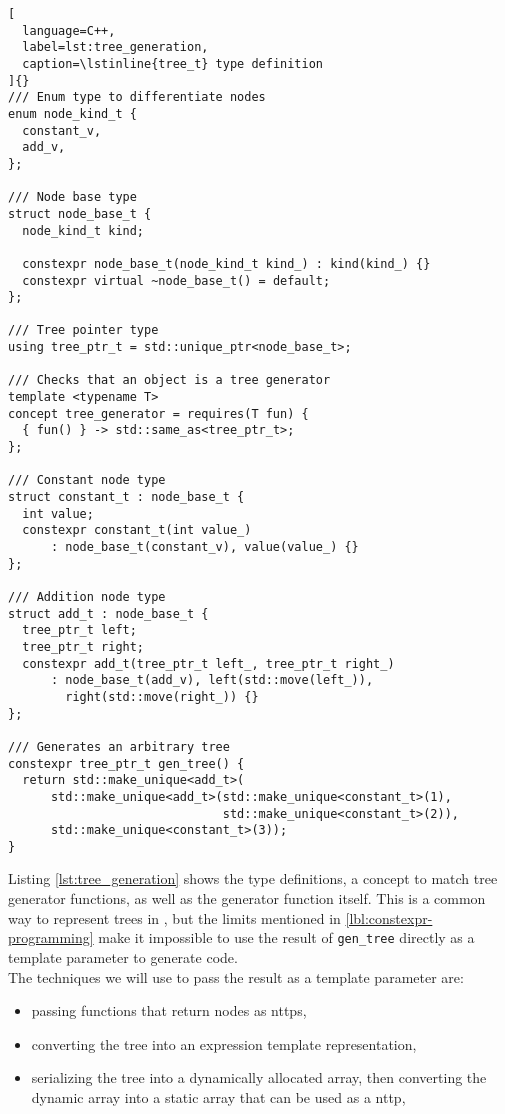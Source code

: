 \documentclass[../main]{subfiles}
\begin{document}
\begin{lstlisting}[
  language=C++,
  label=lst:tree_generation,
  caption=\lstinline{tree_t} type definition
]{}
/// Enum type to differentiate nodes
enum node_kind_t {
  constant_v,
  add_v,
};

/// Node base type
struct node_base_t {
  node_kind_t kind;

  constexpr node_base_t(node_kind_t kind_) : kind(kind_) {}
  constexpr virtual ~node_base_t() = default;
};

/// Tree pointer type
using tree_ptr_t = std::unique_ptr<node_base_t>;

/// Checks that an object is a tree generator
template <typename T>
concept tree_generator = requires(T fun) {
  { fun() } -> std::same_as<tree_ptr_t>;
};

/// Constant node type
struct constant_t : node_base_t {
  int value;
  constexpr constant_t(int value_)
      : node_base_t(constant_v), value(value_) {}
};

/// Addition node type
struct add_t : node_base_t {
  tree_ptr_t left;
  tree_ptr_t right;
  constexpr add_t(tree_ptr_t left_, tree_ptr_t right_)
      : node_base_t(add_v), left(std::move(left_)),
        right(std::move(right_)) {}
};

/// Generates an arbitrary tree
constexpr tree_ptr_t gen_tree() {
  return std::make_unique<add_t>(
      std::make_unique<add_t>(std::make_unique<constant_t>(1),
                              std::make_unique<constant_t>(2)),
      std::make_unique<constant_t>(3));
}
\end{lstlisting}

Listing \ref{lst:tree_generation} shows the type definitions, a concept to
match tree generator functions, as well as the generator function itself.
This is a common way to represent trees in \cpp, but the limits mentioned in
\ref{lbl:constexpr-programming} make it impossible to use the result of
\lstinline{gen_tree} directly as a template parameter to generate code.
\\

The techniques we will use to pass the result as a template parameter are:

\begin{itemize}
\item passing functions that return nodes as \glspl{nttp},
\item converting the tree into an expression template representation,
\item serializing the tree into a dynamically allocated array,
      then converting the dynamic array into a static array that can be used as
      a \gls{nttp},
\end{itemize}
\end{document}
